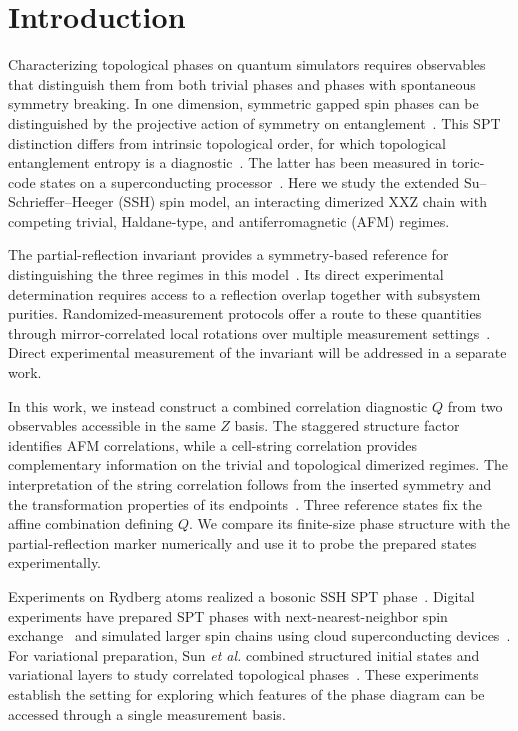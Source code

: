\section{Introduction}
\label{sec:intro}

Characterizing topological phases on quantum simulators requires observables that distinguish them from both trivial phases and phases with spontaneous symmetry breaking.
In one dimension, symmetric gapped spin phases can be distinguished by the projective action of symmetry on entanglement~\cite{chen2011classification,schuch2011classifying}.
This SPT distinction differs from intrinsic topological order, for which topological entanglement entropy is a diagnostic~\cite{kitaev2006topological,levin2006detecting}.
The latter has been measured in toric-code states on a superconducting processor~\cite{satzinger2021realizing}.
Here we study the extended Su--Schrieffer--Heeger (SSH) spin model, an interacting dimerized XXZ chain with competing trivial, Haldane-type, and antiferromagnetic (AFM) regimes.

The partial-reflection invariant provides a symmetry-based reference for distinguishing the three regimes in this model~\cite{elben2020manybody}.
Its direct experimental determination requires access to a reflection overlap together with subsystem purities.
Randomized-measurement protocols offer a route to these quantities through mirror-correlated local rotations over multiple measurement settings~\cite{elben2020manybody}.
Direct experimental measurement of the invariant will be addressed in a separate work.

In this work, we instead construct a combined correlation diagnostic $Q$ from two observables accessible in the same $Z$ basis.
The staggered structure factor identifies AFM correlations, while a cell-string correlation provides complementary information on the trivial and topological dimerized regimes.
The interpretation of the string correlation follows from the inserted symmetry and the transformation properties of its endpoints~\cite{pollmann2012detection,haegeman2012order}.
Three reference states fix the affine combination defining $Q$.
We compare its finite-size phase structure with the partial-reflection marker numerically and use it to probe the prepared states experimentally.

Experiments on Rydberg atoms realized a bosonic SSH SPT phase~\cite{deleseleuc2019observation}.
Digital experiments have prepared SPT phases with next-nearest-neighbor spin exchange~\cite{tan2023realizing} and simulated larger spin chains using cloud superconducting devices~\cite{yu2023simulating}.
For variational preparation, Sun \textit{et al.} combined structured initial states and variational layers to study correlated topological phases~\cite{sun2023efficient}.
These experiments establish the setting for exploring which features of the phase diagram can be accessed through a single measurement basis.


